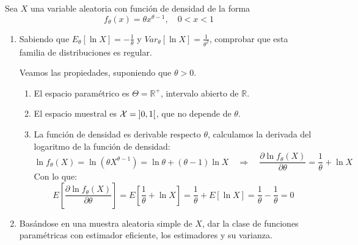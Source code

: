 \begin{ejercicio}\label{ej:10_rel4} 
    Sea $X$ una variable aleatoria con función de densidad de la forma
    \begin{equation*}
        f_\theta(x) = \theta x^{\theta-1}, \quad 0<x<1
    \end{equation*}
    \begin{enumerate}[label=\alph*)]
        \item Sabiendo que $E_\theta[\ln X] = -\frac{1}{\theta}$ y $Var_\theta[\ln X] = \frac{1}{\theta^2}$, comprobar que esta familia de distribuciones es regular.

            Veamos las propiedades, suponiendo que $\theta > 0$.
            \begin{enumerate}
                \item[$i)$] El espacio paramétrico es $\Theta = \mathbb{R}^+$, intervalo abierto de $\mathbb{R}$.
                \item[$ii)$] El espacio muestral es $\mathcal{X} = \left]0,1\right[$, que no depende de $\theta$.
                \item[$iii)$] La función de densidad es derivable respecto $\theta$, calculamos la derivada del logaritmo de la función de densidad:
                    \begin{equation*}
                        \ln f_\theta(X) = \ln(\theta X^{\theta-1}) = \ln\theta + (\theta-1)\ln X \quad \Longrightarrow \quad \dfrac{\partial \ln f_\theta(X)}{\partial \theta} = \frac{1}{\theta} + \ln X
                    \end{equation*}
                    Con lo que:
                    \begin{equation*}
                        E\left[\dfrac{\partial \ln f_\theta(X)}{\partial \theta}\right] = E\left[\frac{1}{\theta} + \ln X\right] = \frac{1}{\theta} + E[\ln X] = \frac{1}{\theta} - \frac{1}{\theta} = 0
                    \end{equation*}
            \end{enumerate}
        \item Basándose en una muestra aleatoria simple de $X$, dar la clase de funciones paramétricas con estimador eficiente, los estimadores y su varianza.


\end{enumerate}
\end{ejercicio}
